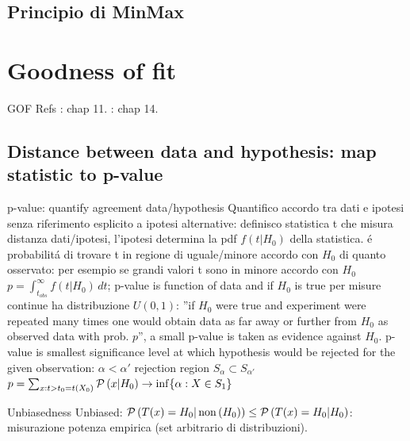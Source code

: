 \documentclass[asd-beamer.tex]{subfiles}
\begin{document}
\subsection{Principio di MinMax}

\begin{frame}{}

\end{frame}

\section{Goodness of fit}

\begin{wordonframe}{GOF Refs}
\cite{james2006statistical}: chap 11. \cite{lehmann2006testing}: chap 14.

\end{wordonframe}

\subsection{Distance between data and hypothesis: map statistic to p-value}

\begin{frame}{p-value: quantify agreement data/hypothesis}
Quantifico accordo tra dati e ipotesi senza riferimento esplicito a ipotesi alternative: definisco statistica t che misura distanza dati/ipotesi, l'ipotesi determina la pdf $f(t|H_0)$ della statistica.  \'e probabilit\'a di trovare t in regione di uguale/minore accordo con $H_0$ di quanto osservato: per esempio se grandi valori t sono in minore accordo con $H_0$ $p=\int_{t_{obs}}^{\infty}f(t|H_0)\,dt$; p-value is function of data and if $H_0$ is true per misure continue ha distribuzione $U(0,1)$: ''if $H_0$ were true and experiment were repeated many times one would obtain data as far away or further from $H_0$ as observed data with prob. $p$'', a small p-value is taken as evidence against $H_0$.
p-value is smallest significance level at which hypothesis would be rejected for the given observation: $\alpha<\alpha'$ rejection region $S_{\alpha}\subset S_{\alpha'}$ $p=\sum_{x:t>t_0=t(X_0)}\operatorname{\mathcal{P}}{(x|H_0)}\to\inf\{\alpha: X\in S_1\}$
\begin{block}{Unbiasedness}
Unbiased: $\operatorname{\mathcal{P}}{(T(x)=H_0|\operatorname{non}{(H_0)})}\leq\operatorname{\mathcal{P}}{(T(x)=H_0|H_0)}$: misurazione potenza empirica (set arbitrario di distribuzioni).
\end{block}
\end{frame}
\end{document}
